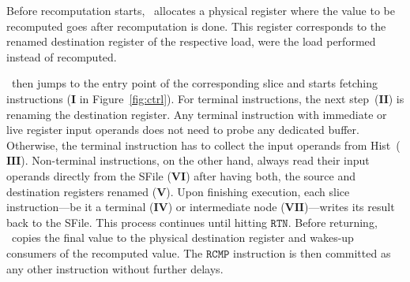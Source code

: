 Before recomputation starts, \arch\ allocates a physical register where the value to be recomputed goes after recomputation is done. This register corresponds to the renamed destination register of the respective load, were the load performed instead of recomputed.

\arch\ then jumps to the entry point of the corresponding slice and starts fetching instructions ($\textbf{I}$ in Figure~\ref{fig:ctrl}). %
For terminal instructions, the next step~($\textbf{II}$) is renaming the destination register. 
Any terminal instruction with immediate or live register input operands does not need to probe any dedicated buffer.
Otherwise, the terminal instruction has to collect the input operands from Hist~($\textbf{III}$).
%
Non-terminal instructions, on the other hand, always read their input operands directly from the SFile ($\textbf{VI}$) after having both, the
source and destination registers renamed ($\textbf{V}$).
Upon finishing execution, each slice instruction---be it a terminal ($\textbf{IV}$) or intermediate node ($\textbf{VII}$)---writes its result back to the SFile. 
This process continues until hitting $\texttt{RTN}$. Before returning, \arch\ copies the final value to the physical destination register 
and wakes-up consumers of the recomputed value.
The $\texttt{RCMP}$ instruction is then committed as any other instruction without further delays.

